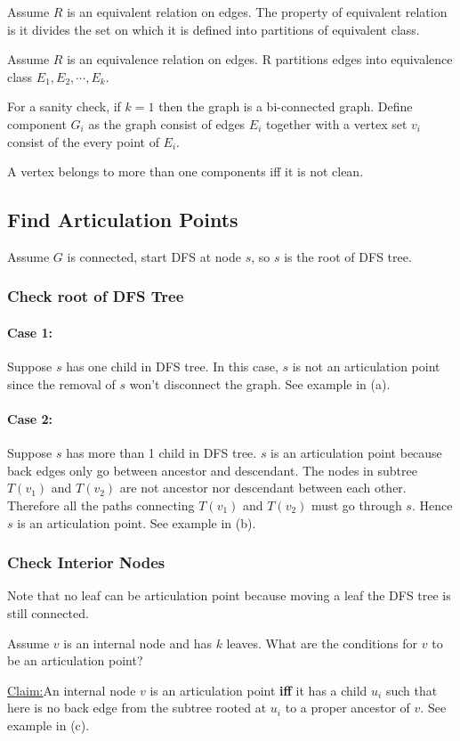 \documentclass[en,hazy,blue,screen,14pt]{elegantnote}
\newenvironment{claim}[1]{\par\noindent\underline{Claim:}\space#1}{}
\begin{document}
Assume $R$ is an equivalent relation on edges. The property of equivalent 
relation is it divides the set on which it is defined into partitions of 
equivalent class.

Assume $R$ is an equivalence relation on edges. R partitions edges into 
equivalence class $E_1, E_2, \cdots, E_k$. 

For a sanity check, if $k = 1$ then the graph is a bi-connected graph. 
Define component $G_i$ as the graph consist of edges $E_i$ together with a 
vertex set $v_i$ consist of the every point of $E_i$.

A vertex belongs to more than one components iff it is not clean.

\subsection{Find Articulation Points}
Assume $G$ is connected, start DFS at node $s$, so $s$ is the root of DFS tree.

\subsubsection{Check root of DFS Tree}
\paragraph{Case 1:} Suppose $s$ has one child in DFS tree. In this case, $s$ is 
not an articulation point since the removal of $s$ won't disconnect the graph. 
See example in (a).

\paragraph{Case 2:} Suppose $s$ has more than 1 child in DFS tree. $s$ is 
an articulation point because back edges only go between ancestor and 
descendant. The nodes in subtree $T(v_1)$ and $T(v_2)$ are not ancestor nor 
descendant between each other. Therefore all the paths connecting $T(v_1)$ and $T(v_2)$ must go through $s$. Hence $s$ is an articulation point. See example in (b).

\subsubsection{Check Interior Nodes}

Note that no leaf can be articulation point because moving a leaf the DFS tree is still connected.

Assume $v$ is an internal node and has $k$ leaves. What are the conditions for $v$ to be an articulation point? 
\begin{claim}
 An internal node $v$ is an articulation point \textbf{iff} it has a child $u_i$ such that here is no back edge from the subtree rooted at $u_i$ to a proper ancestor of $v$. See example in (c).
\end{claim}
\end{document}
